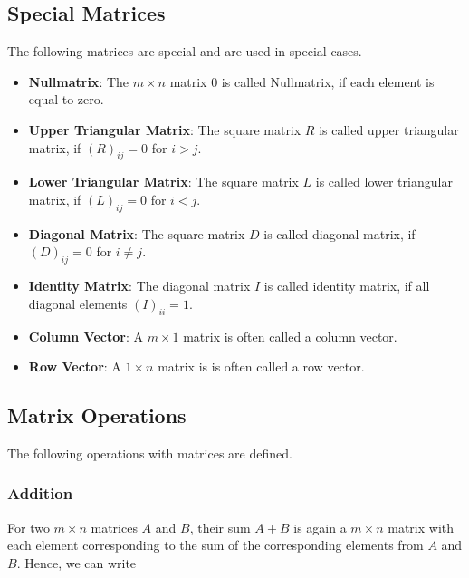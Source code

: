 \documentclass[
]{book}
\providecommand{\tightlist}{%
  \setlength{\itemsep}{0pt}\setlength{\parskip}{0pt}}
\begin{document}
\hypertarget{intro-linalg-special-matrices}{%
\subsection{Special Matrices}\label{intro-linalg-special-matrices}}

The following matrices are special and are used in special cases.

\begin{itemize}
\tightlist
\item
  \textbf{Nullmatrix}: The \(m\times n\) matrix \(0\) is called Nullmatrix, if each element is equal to zero.
\item
  \textbf{Upper Triangular Matrix}: The square matrix \(R\) is called upper triangular matrix, if \((R)_{ij} = 0\) for \(i>j\).
\item
  \textbf{Lower Triangular Matrix}: The square matrix \(L\) is called lower triangular matrix, if \((L)_{ij} = 0\) for \(i<j\).
\item
  \textbf{Diagonal Matrix}: The square matrix \(D\) is called diagonal matrix, if \((D)_{ij} = 0\) for \(i\ne j\).
\item
  \textbf{Identity Matrix}: The diagonal matrix \(I\) is called identity matrix, if all diagonal elements \((I)_{ii} = 1\).
\item
  \textbf{Column Vector}: A \(m\times 1\) matrix is often called a column vector.
\item
  \textbf{Row Vector}: A \(1\times n\) matrix is is often called a row vector.
\end{itemize}

\hypertarget{intro-linalg-matrix-operation}{%
\subsection{Matrix Operations}\label{intro-linalg-matrix-operation}}

The following operations with matrices are defined.

\hypertarget{intro-linalg-matrix-addition}{%
\subsubsection{Addition}\label{intro-linalg-matrix-addition}}

For two \(m\times n\) matrices \(A\) and \(B\), their sum \(A+B\) is again a \(m\times n\) matrix with each element corresponding to the sum of the corresponding elements from \(A\) and \(B\). Hence, we can write
\end{document}
